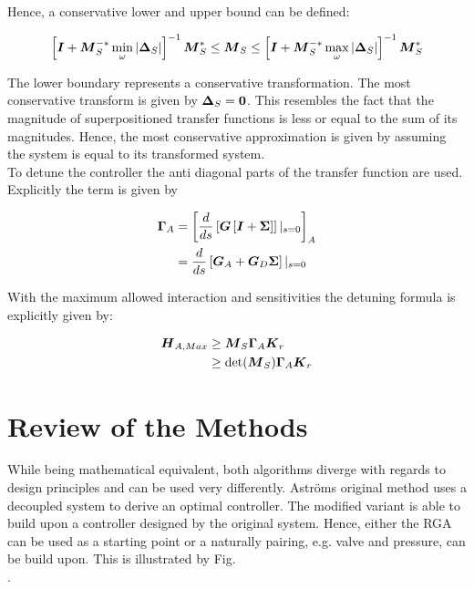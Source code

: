 Hence, a conservative lower and upper bound can be defined:

\begin{align}
\begin{split}
\left[\mbox{\boldmath$I$} + \mbox{\boldmath$M$}_S^{-*} \min_\omega \left|\mbox{\boldmath$\Delta$}_{S}\right| \right]^{-1} \mbox{\boldmath$M$}_S^{*}\leq \mbox{\boldmath$M$}_S \leq 
\left[\mbox{\boldmath$I$} + \mbox{\boldmath$M$}_S^{-*} \max_\omega \left|\mbox{\boldmath$\Delta$}_{S}\right| \right]^{-1} \mbox{\boldmath$M$}_S^{*}
\end{split}
\label{c:controller:e:sensitivitytransformBounds}
\end{align}

The lower boundary represents a conservative transformation. The most conservative transform is given by $\mbox{\boldmath$\Delta$}_S = \mbox{\boldmath$0$}$. This resembles the fact that the magnitude of superpositioned transfer functions is less or equal to the sum of its magnitudes. Hence, the most conservative approximation is given by assuming the system is equal to its transformed system. \\

To detune the controller the anti diagonal parts of the transfer function are used. Explicitly the term is given by

\begin{align}
\begin{split}
\mbox{\boldmath$\Gamma$}_A &= \left[\frac{d}{ds}\left[ \mbox{\boldmath$G$} \left[ \mbox{\boldmath$I$} + \mbox{\boldmath$\Sigma$} \right] \right]|_{s=0}\right]_A\\
&= \frac{d}{ds}\left[ \mbox{\boldmath$G$}_A + \mbox{\boldmath$G$}_D \mbox{\boldmath$\Sigma$} \right]|_{s=0}
\end{split}
\end{align}

With the maximum allowed interaction and sensitivities the detuning formula is explicitly given by:

\begin{align}
\begin{split}
\mbox{\boldmath$H$}_{A,Max} &\geq \mbox{\boldmath$M$}_S \mbox{\boldmath$\Gamma$}_A \mbox{\boldmath$K$}_r \\ 
&\geq \det(\mbox{\boldmath$M$}_S) \mbox{\boldmath$\Gamma$}_A \mbox{\boldmath$K$}_r 
\end{split}
\end{align}

\section{Review of the Methods}\label{c:controller:s:review}

While being mathematical equivalent, both algorithms diverge with regards to design principles and can be used very differently. Astr\"oms original method uses a decoupled system to derive an optimal controller. The modified variant is able to build upon a controller designed by the original system. Hence, either the RGA can be used as a starting point or a naturally pairing, e.g. valve and pressure, can be build upon. This is illustrated by Fig. \\.

